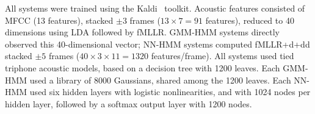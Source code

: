 All systems were trained using the Kaldi~\cite{Kaldi2011}
toolkit. {\color{blue} Acoustic features consisted of MFCC (13
  features), stacked $\pm 3$ frames ($13\times 7=91$ features),
  reduced to 40 dimensions using LDA followed by fMLLR.  GMM-HMM
  systems directly observed this 40-dimensional vector; NN-HMM systems
  computed fMLLR+d+dd stacked $\pm 5$ frames ($40\times 3\times
  11=1320$ features/frame).  All systems used tied triphone acoustic
  models, based on a decision tree with 1200 leaves.  Each GMM-HMM
  used a library of 8000 Gaussians, shared among the 1200 leaves.
  Each NN-HMM used six hidden layers with logistic nonlinearities, and
  with 1024 nodes per hidden layer, followed by a softmax output layer
  with 1200 nodes.}
  






